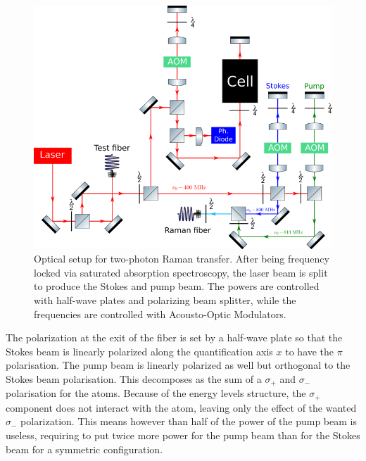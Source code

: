 \begin{figure}
    \centering
    \includegraphics[width=\textwidth]{Fig/Chapter3/table_raman.png}
    \caption[Optical setup for two-photon Raman transfer]{Optical setup for two-photon Raman transfer. After being frequency locked via saturated absorption spectroscopy, the laser beam is split to produce the Stokes and pump beam. The powers are controlled with half-wave plates and polarizing beam splitter, while the frequencies are controlled with Acousto-Optic Modulators.}
    \label{fig:raman_table}
\end{figure}

The polarization at the exit of the fiber is set by a half-wave plate so that the Stokes beam is linearly polarized along the quantification axis $x$ to have the $\pi$ polarisation. The pump beam is linearly polarized as well but orthogonal to the Stokes beam polarisation. This decomposes as the sum of a $\sigma_+$ and $\sigma_-$ polarisation for the atoms. Because of the energy levels structure, the $\sigma_+$ component does not interact with the atom, leaving only the effect of the wanted $\sigma_-$ polarization. This means however than half of the power of the pump beam is useless, requiring to put twice more power for the pump beam than for the Stokes beam for a symmetric configuration.


